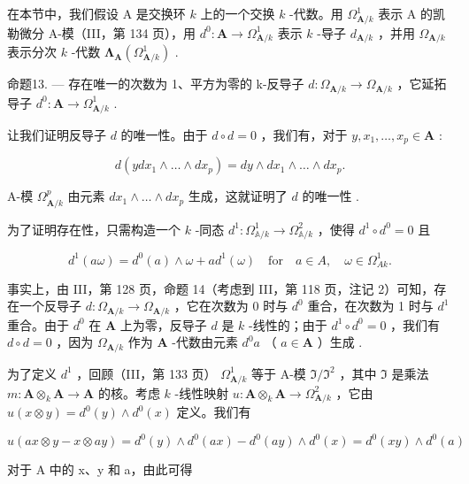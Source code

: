 在本节中，我们假设 A 是交换环 \(k\) 上的一个交换 \(k\) -代数。用 \(\Omega_{\mathbf{A}/k}^{1}\) 表示 A 的凯勒微分 A-模（III，第 134 页），用 \(d^{0}: \mathbf{A} \to \Omega_{\mathbf{A}/k}^{1}\) 表示 \(k\) -导子 \(d_{\mathbf{A}/k}\) ，并用 \(\Omega_{\mathbf{A}/k}\) 表示分次 \(k\) -代数 \(\boldsymbol{\Lambda}_{\mathbf{A}}(\Omega_{\mathbf{A}/k}^{1})\) .

命题13. --- 存在唯一的次数为 1、平方为零的 k-反导子 \(d: \Omega_{\mathbf{A}/k} \to \Omega_{\mathbf{A}/k}\) ，它延拓导子 \(d^{0}: \mathbf{A} \to \Omega_{\mathbf{A}/k}^{1}\) .

让我们证明反导子 \(d\) 的唯一性。由于 \(d \circ d = 0\) ，我们有，对于 \(y, x_1, \ldots, x_p \in \mathbf{A}\) :

\[
d \left(y d x _ {1} \wedge \dots \wedge d x _ {p}\right) = d y \wedge d x _ {1} \wedge \dots \wedge d x _ {p}.
\]

A-模 \(\Omega_{\mathbf{A}/k}^{p}\) 由元素 \(dx_{1} \wedge \ldots \wedge dx_{p}\) 生成，这就证明了 \(d\) 的唯一性 .

为了证明存在性，只需构造一个 \(k\) -同态 \(d^{1}:\Omega_{\mathbb{A}/k}^{1}\to\Omega_{\mathbb{A}/k}^{2}\) ，使得 \(d^{1}\circ d^{0}=0\) 且

\[
d ^ {1} (a \omega) = d ^ {0} (a) \wedge \omega + a d ^ {1} (\omega) \quad \text {for} \quad a \in A, \quad \omega \in \Omega_ {A k} ^ {1}.\tag{11}
\]

事实上，由 III，第 128 页，命题 14（考虑到 III，第 118 页，注记 2）可知，存在一个反导子 \(d: \Omega_{\mathbf{A}/k} \to \Omega_{\mathbf{A}/k}\) ，它在次数为 0 时与 \(d^{0}\) 重合，在次数为 1 时与 \(d^{1}\) 重合。由于 \(d^{0}\) 在 \(\mathbf{A}\) 上为零，反导子 \(d\) 是 \(k\) -线性的；由于 \(d^{1} \circ d^{0} = 0\) ，我们有 \(d \circ d = 0\) ，因为 \(\Omega_{\mathbf{A}/k}\) 作为 \(\mathbf{A}\) -代数由元素 \(d^{0} a\) （ \(a \in \mathbf{A}\) ）生成 .

为了定义 \(d^{1}\) ，回顾（III，第 133 页） \(\Omega_{\mathbf{A}/k}^{1}\) 等于 A-模 \(\mathfrak{I}/\mathfrak{I}^{2}\) ，其中 \(\mathfrak{I}\) 是乘法 \(m: \mathbf{A} \otimes_{k} \mathbf{A} \to \mathbf{A}\) 的核。考虑 \(k\) -线性映射 \(u: \mathbf{A} \otimes_{k} \mathbf{A} \to \Omega_{\mathbf{A}/k}^{2}\) ，它由 \(u(x \otimes y) = d^{0}(y) \wedge d^{0}(x)\) 定义。我们有

\[
u (a x \otimes y - x \otimes a y) = d ^ {0} (y) \wedge d ^ {0} (a x) - d ^ {0} (a y) \wedge d ^ {0} (x) = d ^ {0} (x y) \wedge d ^ {0} (a)
\]

对于 A 中的 x、y 和 a，由此可得

